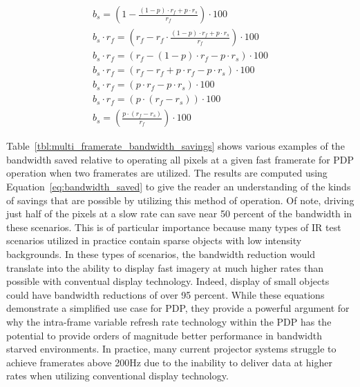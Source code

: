     \begin{equation}
        \begin{array}{ l }
            \displaystyle b_s=\left(1-\frac{(1-p)\cdot r_f + p\cdot r_s}{r_f}\right)\cdot 100 \\[16pt]
            \displaystyle b_s \cdot r_f=\left(r_f-r_f \cdot \frac{(1-p)\cdot r_f + p\cdot r_s}{r_f}\right)\cdot 100 \\[13pt]
            \displaystyle b_s \cdot r_f= (r_f - (1-p)\cdot r_f - p\cdot r_s)\cdot 100 \\[13pt]
            \displaystyle b_s \cdot r_f= (r_f - r_f + p \cdot r_f - p\cdot r_s)\cdot 100 \\[13pt]
            \displaystyle b_s \cdot r_f= (p \cdot r_f - p\cdot r_s)\cdot 100 \\[13pt]
            \displaystyle b_s \cdot r_f= (p \cdot (r_f - r_s))\cdot 100 \\[13pt]
            \displaystyle b_s=\left(\frac{p \cdot (r_f-r_s)}{r_f}\right)\cdot 100
        \end{array}
        \label{eq:bandwidth_saved}
    \end{equation}

    Table~\ref{tbl:multi_framerate_bandwidth_savings} shows various examples of the bandwidth saved relative to operating all pixels at a given fast framerate for PDP operation when two framerates are utilized. The results are computed using Equation~\eqref{eq:bandwidth_saved} to give the reader an understanding of the kinds of savings that are possible by utilizing this method of operation. Of note, driving just half of the pixels at a slow rate can save near 50 percent of the bandwidth in these scenarios. This is of particular importance because many types of IR test scenarios utilized in practice contain sparse objects with low intensity backgrounds. In these types of scenarios, the bandwidth reduction would translate into the ability to display fast imagery at much higher rates than possible with conventual display technology. Indeed, display of small objects could have bandwidth reductions of over 95 percent. While these equations demonstrate a simplified use case for PDP, they provide a powerful argument for why the intra-frame variable refresh rate technology within the PDP has the potential to provide orders of magnitude better performance in bandwidth starved environments. In practice, many current projector systems struggle to achieve framerates above 200Hz due to the inability to deliver data at higher rates when utilizing conventional display technology.

